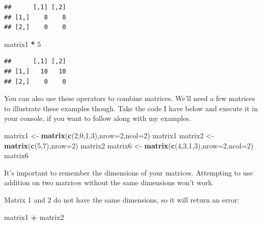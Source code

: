 \documentclass[
]{book}
\newenvironment{Shaded}{\begin{snugshade}}{\end{snugshade}}
\newcommand{\DataTypeTok}[1]{\textcolor[rgb]{0.13,0.29,0.53}{#1}}
\newcommand{\DecValTok}[1]{\textcolor[rgb]{0.00,0.00,0.81}{#1}}
\newcommand{\KeywordTok}[1]{\textcolor[rgb]{0.13,0.29,0.53}{\textbf{#1}}}
\newcommand{\NormalTok}[1]{#1}
\newcommand{\OperatorTok}[1]{\textcolor[rgb]{0.81,0.36,0.00}{\textbf{#1}}}
\newcommand{\StringTok}[1]{\textcolor[rgb]{0.31,0.60,0.02}{#1}}
\begin{document}
\begin{verbatim}
##      [,1] [,2]
## [1,]    8    8
## [2,]    0    0
\end{verbatim}

\begin{Shaded}
\begin{Highlighting}[]
\NormalTok{matrix1 }\OperatorTok{*}\StringTok{ }\DecValTok{5}
\end{Highlighting}
\end{Shaded}

\begin{verbatim}
##      [,1] [,2]
## [1,]   10   10
## [2,]    0    0
\end{verbatim}

You can also use these operators to combine matrices. We'll need a few matrices to illustrate these examples though. Take the code I have below and execute it in your console, if you want to follow along with my examples.

\begin{Shaded}
\begin{Highlighting}[]
\NormalTok{matrix1 <-}\StringTok{ }\KeywordTok{matrix}\NormalTok{(}\KeywordTok{c}\NormalTok{(}\DecValTok{2}\NormalTok{,}\DecValTok{0}\NormalTok{,}\DecValTok{1}\NormalTok{,}\DecValTok{3}\NormalTok{),}\DataTypeTok{nrow=}\DecValTok{2}\NormalTok{,}\DataTypeTok{ncol=}\DecValTok{2}\NormalTok{)}
\NormalTok{matrix1}
\NormalTok{matrix2 <-}\StringTok{ }\KeywordTok{matrix}\NormalTok{(}\KeywordTok{c}\NormalTok{(}\DecValTok{5}\NormalTok{,}\DecValTok{7}\NormalTok{),}\DataTypeTok{nrow=}\DecValTok{2}\NormalTok{)}
\NormalTok{matrix2}
\NormalTok{matrix6 <-}\StringTok{ }\KeywordTok{matrix}\NormalTok{(}\KeywordTok{c}\NormalTok{(}\DecValTok{4}\NormalTok{,}\DecValTok{3}\NormalTok{,}\DecValTok{1}\NormalTok{,}\DecValTok{3}\NormalTok{),}\DataTypeTok{nrow=}\DecValTok{2}\NormalTok{,}\DataTypeTok{ncol=}\DecValTok{2}\NormalTok{)}
\NormalTok{matrix6}
\end{Highlighting}
\end{Shaded}

It's important to remember the dimensions of your matrices. Attempting to use addition on two matrices without the same dimensions won't work.

Matrix 1 and 2 do not have the same dimensions, so it will return an error:

\begin{Shaded}
\begin{Highlighting}[]
\NormalTok{matrix1 }\OperatorTok{+}\StringTok{ }\NormalTok{matrix2}
\end{Highlighting}
\end{Shaded}
\end{document}
